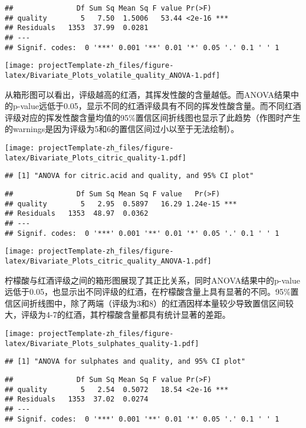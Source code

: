 \documentclass[]{article}
\begin{document}
\begin{verbatim}
##               Df Sum Sq Mean Sq F value Pr(>F)    
## quality        5   7.50  1.5006   53.44 <2e-16 ***
## Residuals   1353  37.99  0.0281                   
## ---
## Signif. codes:  0 '***' 0.001 '**' 0.01 '*' 0.05 '.' 0.1 ' ' 1
\end{verbatim}

\texttt{[image: projectTemplate-zh\_files/figure-latex/Bivariate\_Plots\_volatile\_quality\_ANOVA-1.pdf]}

从箱形图可以看出，评级越高的红酒，其挥发性酸的含量越低。而ANOVA结果中的p-value远低于0.05，显示不同的红酒评级具有不同的挥发性酸含量。而不同红酒评级对应的挥发性酸含量均值的95\%置信区间折线图也显示了此趋势（作图时产生的warnings是因为评级为5和6的置信区间过小以至于无法绘制）。

\texttt{[image: projectTemplate-zh\_files/figure-latex/Bivariate\_Plots\_citric\_quality-1.pdf]}

\begin{verbatim}
## [1] "ANOVA for citric.acid and quality, and 95% CI plot"
\end{verbatim}

\begin{verbatim}
##               Df Sum Sq Mean Sq F value   Pr(>F)    
## quality        5   2.95  0.5897   16.29 1.24e-15 ***
## Residuals   1353  48.97  0.0362                     
## ---
## Signif. codes:  0 '***' 0.001 '**' 0.01 '*' 0.05 '.' 0.1 ' ' 1
\end{verbatim}

\texttt{[image: projectTemplate-zh\_files/figure-latex/Bivariate\_Plots\_citric\_quality\_ANOVA-1.pdf]}

柠檬酸与红酒评级之间的箱形图展现了其正比关系，同时ANOVA结果中的p-value远低于0.05，也显示出不同评级的红酒，在柠檬酸含量上具有显著的不同。95\%置信区间折线图中，除了两端（评级为3和8）的红酒因样本量较少导致置信区间较大，评级为4-7的红酒，其柠檬酸含量都具有统计显著的差距。

\texttt{[image: projectTemplate-zh\_files/figure-latex/Bivariate\_Plots\_sulphates\_quality-1.pdf]}

\begin{verbatim}
## [1] "ANOVA for sulphates and quality, and 95% CI plot"
\end{verbatim}

\begin{verbatim}
##               Df Sum Sq Mean Sq F value Pr(>F)    
## quality        5   2.54  0.5072   18.54 <2e-16 ***
## Residuals   1353  37.02  0.0274                   
## ---
## Signif. codes:  0 '***' 0.001 '**' 0.01 '*' 0.05 '.' 0.1 ' ' 1
\end{verbatim}
\end{document}
